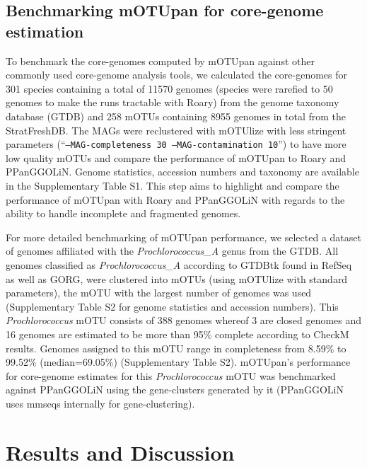 \documentclass{article}
\begin{document}
\subsection*{Benchmarking mOTUpan for core-genome estimation}

To benchmark the core-genomes computed by mOTUpan against other commonly used core-genome analysis tools, we calculated the core-genomes for 301 species containing a total of 11570 genomes (species were rarefied to 50 genomes to make the runs tractable with Roary) from the genome taxonomy database (GTDB)\citep{parks_2020} and  258 mOTUs containing 8955 genomes in total from the StratFreshDB\citep{buck_2021a}. The MAGs were reclustered with mOTUlize\citep{buck_2021} with less stringent parameters (``\texttt{--MAG-completeness 30  --MAG-contamination 10}'') to have more low quality mOTUs and compare the performance of mOTUpan to Roary\citep{page_2015} and PPanGGOLiN\citep{gautreau_2020}. Genome statistics, accession numbers and taxonomy are available in the Supplementary Table S1. This step aims to highlight and compare the performance of mOTUpan with Roary and PPanGGOLiN with regards to the ability to handle incomplete and fragmented genomes.

For more detailed benchmarking of mOTUpan performance, we selected a dataset of genomes affiliated with the \textit{Prochlorococcus\_A} genus from the GTDB. All genomes classified as \textit{Prochlorococcus\_A} according to GTDBtk\citep{chaumeil_2020} found in RefSeq as well as GORG\citep{pachiadaki_2019}, were clustered into mOTUs (using mOTUlize\citep{buck_2021} with standard parameters), the mOTU with the largest number of genomes was used (Supplementary Table S2 for genome statistics and accession numbers). This \textit{Prochlorococcus} mOTU consists of 388 genomes whereof 3 are closed genomes and 16 genomes are estimated to be more than 95\% complete according to CheckM\citep{parks_2015} results. Genomes assigned to this mOTU range in completeness from 8.59\% to 99.52\% (median=69.05\%) (Supplementary Table S2). mOTUpan’s performance for core-genome estimates for this \textit{Prochlorococcus} mOTU was benchmarked against PPanGGOLiN using the gene-clusters generated by it (PPanGGOLiN uses mmseqs\citep{steinegger_2017} internally for gene-clustering).

\section*{Results and Discussion}
\end{document}

